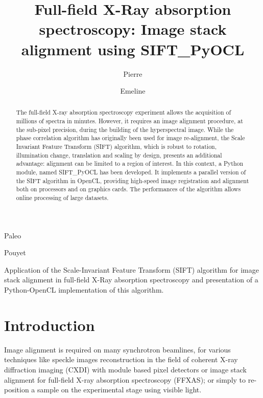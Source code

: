 \documentclass[preprint]{iucr}
\begin{document}
\title{Full-field X-Ray absorption spectroscopy: Image stack
alignment using SIFT\_PyOCL}

    \author[a]{Pierre}{Paleo}
    \author[a]{Emeline}{Pouyet}

\maketitle

\begin{synopsis}
Application of the Scale-Invariant Feature Transform (SIFT) algorithm for image
stack alignment in full-field X-Ray absorption spectroscopy and presentation of
a Python-OpenCL implementation of this algorithm.
\end{synopsis}

\begin{abstract}
The full-field X-ray absorption spectroscopy experiment allows the acquisition
of millions of spectra in minutes. However, it requires an image alignment
procedure, at the sub-pixel precision, during the building of the hyperspectral
image.
While the phase correlation algorithm has originally been used for image
re-alignment, the Scale Invariant Feature Transform (SIFT) algorithm, which
is robust to rotation, illumination change, translation and scaling by design,
presents an additional advantage: alignment can be limited to a region of
interest.
In this context, a Python module, named  SIFT\_PyOCL has been developed. 
It implements a parallel version of the SIFT algorithm in OpenCL, providing
high-speed image registration and alignment both on processors and on graphics cards. 
The performances of the algorithm allows
online processing of large datasets.

\end{abstract}

\section{Introduction}

Image alignment is required on many synchrotron beamlines, for
various techniques like speckle images reconstruction in the field of coherent
X-ray diffraction imaging (CXDI) with module based pixel detectors or image
stack alignment for full-field X-ray absorption spectroscopy (FFXAS); or
simply to re-position a sample on the experimental stage using visible light.
\end{document}
